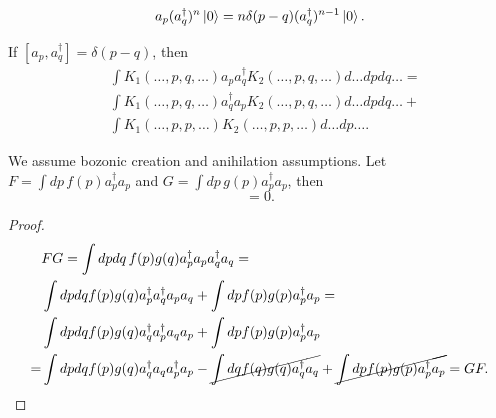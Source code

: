 \documentclass[main.tex]{subfiles}
\begin{document}
\begin{corollary}
\begin{equation}
a_p (a_{q}^\dagger)^n \ket{0} = n \delta(p - q) (a_{q}^\dagger)^{n-1} \ket{0}.
\end{equation}
\end{corollary}

\begin{lemma}
If $[a_p, a^\dagger_q] = \delta(p - q)$, then
\begin{align*}
&\int K_1(\dots, p, q, \dots) a_p a^\dagger_q K_2(\dots, p, q, \dots) d \dots dpdq \ldots = \\
&\int K_1(\dots, p, q, \dots) a^\dagger_q a_p K_2(\dots, p, q, \dots) d \dots dpdq \ldots + \\ 
&\int K_1(\dots, p, p, \dots)K_2(\dots, p,p, \dots)d \dots dp \dots.
\end{align*}
\end{lemma}

\begin{proposition} We assume bozonic creation and anihilation assumptions.
Let $F = \int dp\, f(p)a^\dagger_p a_p$ and $G = \int dp\, g(p)a^\dagger_p a_p$, then
\begin{equation}
[F, G] = 0.
\end{equation} 
\end{proposition}
\begin{proof}
\begin{align*}
&FG = \int dp dq \,f(p)g(q) a^\dagger_p a_p a^\dagger_q a_q = \\
& \int dp dq f(p)g(q) a^\dagger_p  a^\dagger_q a_p a_q + \int dp f(p)g(p) a^\dagger_p a_p =  \\
& \int dp dq f(p)g(q) a^\dagger_q a^\dagger_p  a_q  a_p  + \int dp f(p)g(p) a^\dagger_p a_p \\ =
& \int dp dq f(p)g(q) a^\dagger_q a_q a^\dagger_p   a_p - \cancel{\int dq f(q)g(q) a^\dagger_q    a_q}  + \cancel{\int dp f(p)g(p) a^\dagger_p a_p} 
= GF. \\ 
\end{align*}
\end{proof}
\end{document}
